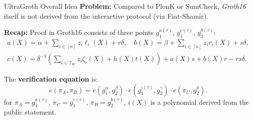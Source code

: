 \documentclass{zkdl-presentation-template}
\begin{document}
\begin{frame}{UltraGroth Overall Idea}
    \textbf{Problem:} Compared to PlonK or SumCheck, \textit{Groth16} itself is
    not derived from the interactive protocol (via Fiat-Shamir).\pause

    \textbf{Recap:} Proof in Groth16 consists of three points $g_1^{a(\tau)}$,
    $g_1^{c(\tau)}$, $g_2^{b(\tau)}$:
    \begin{gather*}
        a(X) = \alpha + \sum_{i \in [n]}z_i\ell_i(X) + r\delta, \quad b(X) = \beta + \sum_{i \in [n]}z_ir_i(X) + s\delta, \\
        c(X) = \delta^{-1}\left(\sum_{i \in \mathcal{I}_W} z_i\zeta_i(X)+h(X)t(X)\right) + a(X)s + b(X)r - rs\delta.    
    \end{gather*}

    \pause The \textbf{verification equation} is:
    \begin{equation*}
        e(\pi_A,\pi_B) = e(g_1^{\alpha},g_2^{\beta})\cdot e(g_1^{i(\tau)},g_2^{\gamma})\cdot e(\pi_C,g_2^{\delta}).
    \end{equation*}
    for $\pi_A = g_1^{a(\tau)}$, $\pi_C = g_1^{c(\tau)}$, $\pi_B =
    g_2^{b(\tau)}$, $i(X)$ is a polynomial derived from the public statement.
\end{frame}
\end{document}
